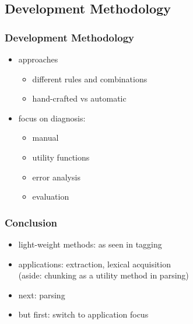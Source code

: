 \documentclass{beamer}             %
\begin{document}
\subsection{Development Methodology}

\begin{frame}
  \frametitle{Development Methodology}
  \begin{itemize}
  \item approaches
    \begin{itemize}
    \item different rules and combinations
    \item hand-crafted vs automatic
    \end{itemize}
  \item focus on diagnosis:
    \begin{itemize}
    \item manual
    \item utility functions
    \item error analysis
    \item evaluation
    \end{itemize}
  \end{itemize}
\end{frame}

\begin{frame}
  \frametitle{Conclusion}
  \begin{itemize}
  \item light-weight methods: as seen in tagging
  \item applications: extraction, lexical acquisition\\
    (aside: chunking as a utility method in parsing)
  \item next: parsing
  \item but first: switch to application focus
  \end{itemize}
\end{frame}
\end{document}
